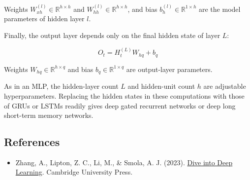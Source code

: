 Weights \(W_{xh}^{(l)} \in \mathbb{R}^{h \times h}\) and \(W_{hh}^{(l)} \in \mathbb{R}^{h \times h}\), and bias \(b_h^{(l)} \in \mathbb{R}^{1 \times h}\) are the model parameters of hidden layer \(l\).

Finally, the output layer depends only on the final hidden state of layer \(L\):

\[
O_t = H_t^{(L)}W_{hq} + b_q
\]

Weights \(W_{hq} \in \mathbb{R}^{h \times q}\) and bias \(b_q \in \mathbb{R}^{1 \times q}\) are output-layer parameters.

As in an MLP, the hidden-layer count \(L\) and hidden-unit count \(h\) are adjustable hyperparameters. Replacing the hidden states in these computations with those of GRUs or LSTMs readily gives deep gated recurrent networks or deep long short-term memory networks.

\FloatBarrier
{}
\hypertarget{references-22}{%
\subsection{References}\label{references-22}}

\vspace{0.25em}
\begin{itemize}
\tightlist
\item
  Zhang, A., Lipton, Z. C., Li, M., \& Smola, A. J. (2023). \href{https://D2L.ai}{Dive into Deep Learning}. Cambridge University Press.
\end{itemize}

\clearpage
